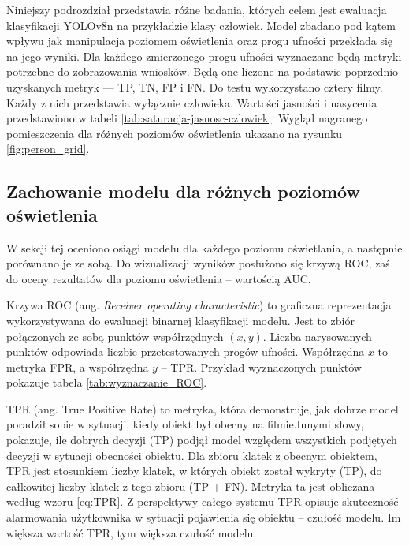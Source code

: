 Niniejszy podrozdział przedstawia różne badania, których celem jest ewaluacja klasyfikacji YOLOv8n na przykładzie klasy człowiek. Model zbadano pod kątem wpływu jak manipulacja poziomem oświetlenia oraz progu ufności przekłada się na jego wyniki. Dla każdego zmierzonego progu ufności wyznaczane będą metryki potrzebne do zobrazowania wniosków. Będą one liczone na podstawie poprzednio uzyskanych metryk --- TP, TN, FP i FN. Do testu wykorzystano cztery filmy. Każdy z nich przedstawia wyłącznie człowieka. Wartości jasności i nasycenia przedstawiono w tabeli \ref{tab:saturacja-jasnosc-czlowiek}. Wygląd nagranego pomieszczenia dla różnych poziomów oświetlenia ukazano na rysunku \ref{fig:person_grid}. 









\subsection{Zachowanie modelu dla różnych poziomów oświetlenia}
\label{sec:test-AUC}
W sekcji tej oceniono osiągi modelu dla każdego poziomu oświetlania, a następnie porównano je ze sobą. Do wizualizacji wyników posłużono się krzywą ROC, zaś do oceny rezultatów dla poziomu oświetlenia -- wartością AUC.

Krzywa ROC (ang. \emph{Receiver operating characteristic}) to graficzna reprezentacja wykorzystywana do ewaluacji binarnej klasyfikacji modelu. Jest to zbiór połączonych ze sobą punktów współrzędnych $(x, y)$. Liczba narysowanych punktów odpowiada liczbie przetestowanych progów ufności. Współrzędna $x$ to metryka FPR, a współrzędna $y$ -- TPR. Przykład wyznaczonych punktów pokazuje tabela \ref{tab:wyznaczanie_ROC}. 


TPR (ang. True Positive Rate) to metryka, która demonstruje, jak dobrze model poradził sobie w sytuacji, kiedy obiekt był obecny na filmie.Innymi słowy, pokazuje, ile dobrych decyzji (TP) podjął model względem wszystkich podjętych decyzji w sytuacji obecności obiektu. Dla zbioru klatek z obecnym obiektem, TPR jest stosunkiem liczby klatek, w których obiekt został wykryty (TP), do całkowitej liczby klatek z tego zbioru (TP + FN). Metryka ta jest obliczana według wzoru \ref{eq:TPR}. Z perspektywy całego systemu TPR opisuje skuteczność alarmowania użytkownika w sytuacji pojawienia się obiektu -- czułość modelu. Im większa wartość TPR, tym większa czułość modelu.

